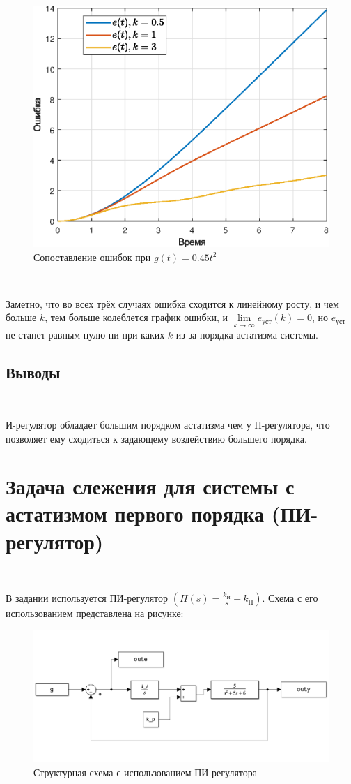 \documentclass[a4paper]{article}
\begin{document}
\begin{figure}[H]
    \centering
    \includegraphics[width=0.55\linewidth]{ex4/all_g_at2_error.eps}
    \caption{Сопоставление ошибок при $g(t)=0.45t^2$}
\end{figure}\

Заметно, что во всех трёх случаях ошибка сходится к линейному росту, и чем больше $k$, тем больше колеблется график ошибки, и $\underset{k \to \infty}{\lim} e_{\text{уст}}(k) = 0$, но $e_{\text{уст}}$ не станет равным нулю ни при каких $k$ из-за порядка астатизма системы.

\subsection{Выводы}\ 

И-регулятор обладает большим порядком астатизма чем у П-регулятора, что позволяет ему сходиться к задающему воздействию большего порядка.

\section{Задача слежения для системы с астатизмом первого порядка (ПИ-регулятор)}\

В задании используется ПИ-регулятор $(H(s) = \frac{k_\text{И}}{s} + k_\text{П})$. Схема с его использованием представлена на рисунке:

\begin{figure}[H]
    \centering
    \includegraphics[width=0.65\linewidth]{ex5/scheme.png}
    \caption{Структурная схема с использованием ПИ-регулятора}
\end{figure}\
\end{document}
